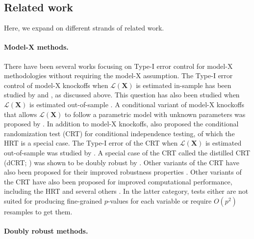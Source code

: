 \documentclass[12pt]{article}
\theoremstyle{definition}
\theoremstyle{remark}
\newcommand{\prx}{\bm X}								%
\newcommand{\law}{\mathcal L}							%
\begin{document}
	\subsection{Related work} \label{sec:related-work}

	Here, we expand on different strands of related work.  
	
	\paragraph{Model-X methods.} There have been several works focusing on Type-I error control for model-X methodologies without requiring the model-X assumption. The Type-I error control of model-X knockoffs when $\law(\prx)$ is estimated in-sample has been studied by \citet{Fan2018a} and \citet{Fan2023}, as discussed above. This question has also been studied when $\law(\prx)$ is estimated out-of-sample \citep{Barber2018, Fan2020}. A conditional variant of model-X knockoffs that allows $\law(\prx)$ to follow a parametric model with unknown parameters was proposed by \citet{Huang2019}. In addition to model-X knockoffs, \citet{CetL16} also proposed the conditional randomization test (CRT) for conditional independence testing, of which the HRT is a special case. The Type-I error of the CRT when $\law(\prx)$ is estimated out-of-sample was studied by \citet{Berrett2019}. A special case of the CRT called the distilled CRT (dCRT; \cite{Liu2020}) was shown to be doubly robust by \citet{Niu2022}. Other variants of the CRT have also been proposed for their improved robustness properties \citep{Berrett2019,Li2022b,Barber2020,Zhu2023}. Other variants of the CRT have also been proposed for improved computational performance, including the HRT and several others \citep{Tansey2018,Zhong2021,Li2021c,Liu2020}. In the latter category, tests either are not suited for producing fine-grained $p$-values for each variable or require $O(p^2)$ resamples to get them. 
 	
	\paragraph{Doubly robust methods.}
\end{document}

